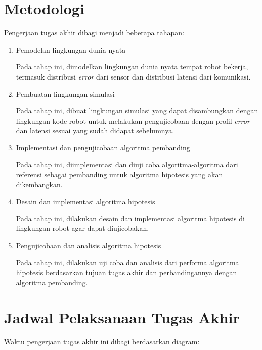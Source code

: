 \section{Metodologi}

Pengerjaan tugas akhir dibagi menjadi beberapa tahapan:

\begin{enumerate}
    \item Pemodelan lingkungan dunia nyata

          Pada tahap ini, dimodelkan lingkungan dunia nyata tempat robot bekerja, termasuk distribusi \textit{error} dari sensor dan distribusi latensi dari komunikasi.

    \item Pembuatan lingkungan simulasi

          Pada tahap ini, dibuat lingkungan simulasi yang dapat disambungkan dengan lingkungan kode robot untuk melakukan pengujicobaan dengan profil \textit{error} dan latensi sesuai yang sudah didapat sebelumnya.

    \item Implementasi dan pengujicobaan algoritma pembanding

          Pada tahap ini, diimplementasi dan diuji coba algoritma-algoritma dari referensi sebagai pembanding untuk algoritma hipotesis yang akan dikembangkan.

    \item Desain dan implementasi algoritma hipotesis

          Pada tahap ini, dilakukan desain dan implementasi algoritma hipotesis di lingkungan robot agar dapat diujicobakan.

    \item Pengujicobaan dan analisis algoritma hipotesis

          Pada tahap ini, dilakukan uji coba dan analisis dari performa algoritma hipotesis berdasarkan tujuan tugas akhir dan perbandingannya dengan algoritma pembanding.
\end{enumerate}

\section{Jadwal Pelaksanaan Tugas Akhir}

Waktu pengerjaan tugas akhir ini dibagi berdasarkan diagram:

